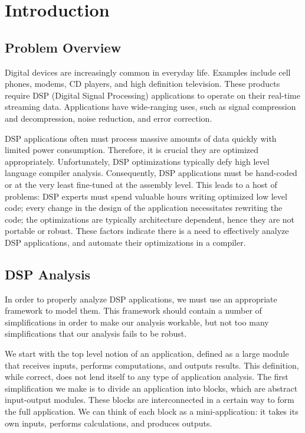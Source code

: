 \chapter{Introduction}

\section{Problem Overview}

    Digital devices are increasingly common in everyday
life. Examples include cell phones, modems, CD players, and high
definition television. These products require DSP (Digital Signal
Processing) applications to operate on their real-time streaming
data. Applications have wide-ranging uses, such as signal
compression and decompression, noise reduction, and error
correction.

    DSP applications often must process massive amounts of data
quickly with limited power consumption. Therefore, it is crucial
they are optimized appropriately. Unfortunately, DSP optimizations
typically defy high level language compiler analysis.
Consequently, DSP applications must be hand-coded or at the very
least fine-tuned at the assembly level. This leads to a host of
problems: DSP experts must spend valuable hours writing optimized
low level code; every change in the design of the application
necessitates rewriting the code; the optimizations are typically
architecture dependent, hence they are not portable or robust.
These factors indicate there is a need to effectively analyze DSP
applications, and automate their optimizations in a compiler.

\section{DSP Analysis}

    In order to properly analyze DSP applications, we must use an
appropriate framework to model them.  This framework should
contain a number of simplifications in order to make our analysis
workable, but not too many simplifications that our analysis fails
to be robust.

    We start with the top level notion of an
application, defined as a large module that receives inputs,
performs computations, and outputs results.  This definition,
while correct, does not lend itself to any type of application
analysis. The first simplification we make is to divide an
application into blocks, which are abstract input-output modules.
These blocks are interconnected in a certain way to form the full
application. We can think of each block as a mini-application: it
takes its own inputs, performs calculations, and produces outputs.

